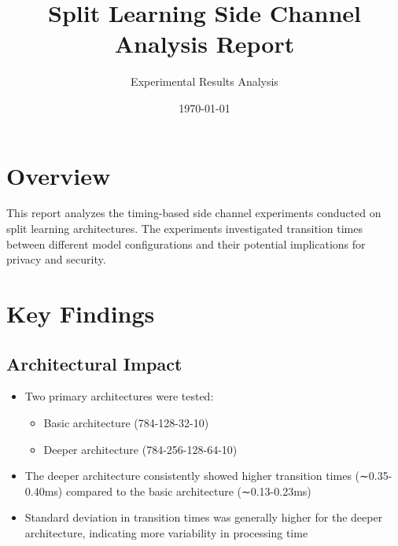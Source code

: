 \documentclass[10pt]{article}
\title{Split Learning Side Channel Analysis Report}
\author{Experimental Results Analysis}
\date{\today}
\begin{document}
\maketitle

\section{Overview}
This report analyzes the timing-based side channel experiments conducted on split learning architectures. The experiments investigated transition times between different model configurations and their potential implications for privacy and security.

\section{Key Findings}

\subsection{Architectural Impact}
\begin{itemize}
    \item Two primary architectures were tested:
        \begin{itemize}
            \item Basic architecture (784-128-32-10)
            \item Deeper architecture (784-256-128-64-10)
        \end{itemize}
    \item The deeper architecture consistently showed higher transition times (∼0.35-0.40ms) compared to the basic architecture (∼0.13-0.23ms)
    \item Standard deviation in transition times was generally higher for the deeper architecture, indicating more variability in processing time
\end{itemize}
\end{document}
